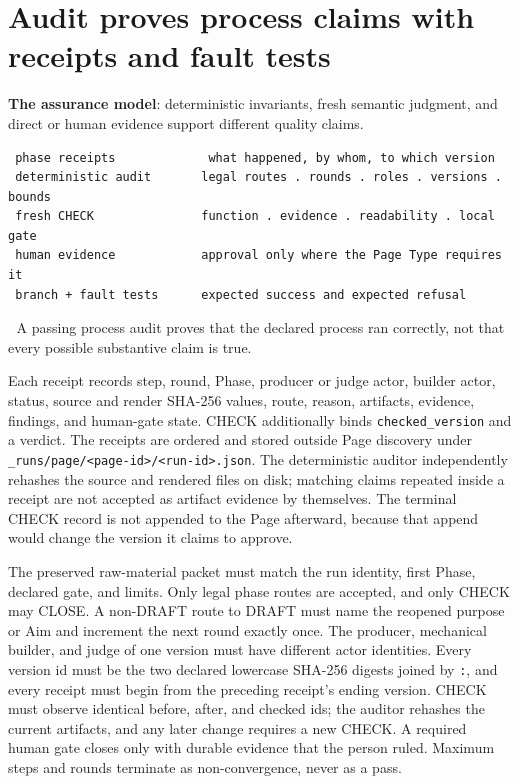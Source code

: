 \section{Audit proves process claims with receipts and fault tests}
\textbf{The assurance model}: deterministic invariants, fresh semantic judgment, and direct or human evidence support different quality claims.

\begin{verbatim}
 phase receipts             what happened, by whom, to which version
 deterministic audit       legal routes . rounds . roles . versions . bounds
 fresh CHECK               function . evidence . readability . local gate
 human evidence            approval only where the Page Type requires it
 branch + fault tests      expected success and expected refusal
\end{verbatim}
📌 A passing process audit proves that the declared process ran correctly, not that every possible substantive claim is true.

Each receipt records step, round, Phase, producer or judge actor, builder actor, status, source and render SHA-256 values, route, reason, artifacts, evidence, findings, and human-gate state. CHECK additionally binds \texttt{checked\_version} and a verdict. The receipts are ordered and stored outside Page discovery under \texttt{\_runs/page/<page-id>/<run-id>.json}. The deterministic auditor independently rehashes the source and rendered files on disk; matching claims repeated inside a receipt are not accepted as artifact evidence by themselves. The terminal CHECK record is not appended to the Page afterward, because that append would change the version it claims to approve.

The preserved raw-material packet must match the run identity, first Phase, declared gate, and limits. Only legal phase routes are accepted, and only CHECK may CLOSE. A non-DRAFT route to DRAFT must name the reopened purpose or Aim and increment the next round exactly once. The producer, mechanical builder, and judge of one version must have different actor identities. Every version id must be the two declared lowercase SHA-256 digests joined by \texttt{:}, and every receipt must begin from the preceding receipt's ending version. CHECK must observe identical before, after, and checked ids; the auditor rehashes the current artifacts, and any later change requires a new CHECK. A required human gate closes only with durable evidence that the person ruled. Maximum steps and rounds terminate as non-convergence, never as a pass.

